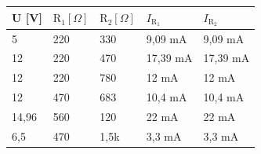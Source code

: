 \begin{tabular}{l|ll|ll}
U [V] & $\text{R}_1 [\Omega]$& $\text{R}_2 [\Omega]$& $I_{\text{R}_1}$ & $I_{\text{R}_2}$\\ \hline
5     & 220 & 330  & 9,09 mA  & 9,09 mA  \\
12    & 220 & 470  & 17,39 mA & 17,39 mA \\
12    & 220 & 780  & 12 mA    & 12 mA    \\
12    & 470 & 683  & 10,4 mA  & 10,4 mA  \\
14,96 & 560 & 120  & 22 mA    & 22 mA    \\
6,5   & 470 & 1,5k &  3,3 mA  &  3,3 mA  \\
\end{tabular}
